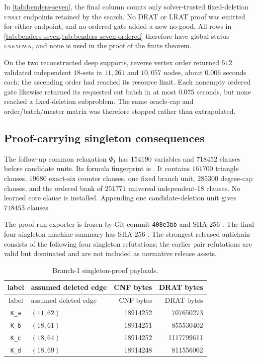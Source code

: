 In \cref{tab:benders-seven}, the final column counts only solver-trusted
fixed-deletion \textsc{unsat} endpoints retained by the search.  No DRAT or
LRAT proof was emitted for either endpoint, and no ordered gate added a new
no-good.  All rows in
\cref{tab:benders-seven,tab:benders-seven-ordered} therefore have global
status \textsc{unknown}, and
none is used in the proof of the finite theorem.

On the two reconstructed deep supports, reverse vertex order returned \(512\)
validated independent \(18\)-sets in \(11{,}261\) and \(10{,}057\) nodes,
about \(0.006\) seconds each; the ascending order had reached its resource
limit.  Each nonempty ordered gate likewise returned its requested cut batch
in at most \(0.075\) seconds, but none reached a fixed-deletion subproblem.
The same oracle-cap and order/batch/master matrix was therefore stopped rather
than extrapolated.

\subsection{Proof-carrying singleton consequences}

The follow-up common relaxation \(\Psi_1\) has \(154190\) variables and
\(718452\) clauses before candidate units.  Its formula fingerprint is
.
It contains \(161700\) triangle clauses, \(19680\) exact-six counter clauses,
one fixed branch unit, \(285300\) degree-cap clauses, and the ordered bank of
\(251771\) universal independent-18 clauses.  No learned core clause is
installed.  Appending one candidate-deletion unit gives \(718453\) clauses.

The proof-run exporter is frozen by Git commit \texttt{408e3bb} and SHA-256
.
The final four-singleton machine summary has SHA-256
.
The strongest released antichain consists of the following four singleton
refutations; the earlier pair refutations are valid but dominated and are not
included as normative release assets.

\begin{longtable}{@{}clrr@{}}
\caption{Branch-1 singleton-proof payloads.}
\label{tab:branch1-singleton-proofs}\\
\toprule
label & assumed deleted edge & CNF bytes & DRAT bytes\\
\midrule
\endfirsthead
\toprule
label & assumed deleted edge & CNF bytes & DRAT bytes\\
\midrule
\endhead
\texttt{K\_a} & \((11,62)\) & 18914252 & 707650273\\
\texttt{K\_b} & \((18,61)\) & 18914251 & 855530402\\
\texttt{K\_c} & \((18,64)\) & 18914252 & 1117799611\\
\texttt{K\_d} & \((18,69)\) & 18914248 & 811556002\\
\bottomrule
\end{longtable}

